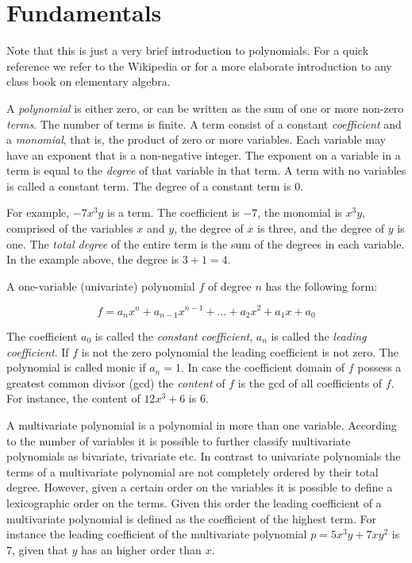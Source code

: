 

\section{Fundamentals}

Note that this is just a very brief introduction to polynomials. 
For a quick reference we refer to the Wikipedia or for a more elaborate 
introduction to any class book on elementary algebra. 

A {\em polynomial} is either zero, or can be written as the sum of one or more 
non-zero {\em terms}. The number of terms is finite. A term consist of a 
constant {\em coefficient} and a {\em monomial}, 
that is, the product of zero or more variables. 
Each variable may have an exponent that is a non-negative integer. 
The exponent on a variable in a term is equal to the {\em degree} of that 
variable in that term. A term with no variables is called a constant term.
The degree of a constant term is 0. 

For example, $-7x^3y$ is a term. The coefficient is $-7$, 
the monomial is $x^3y$, comprised of the variables $x$ and $y$, 
the degree of $x$ is three, and the degree of $y$ is one. 
The {\em total degree} of the entire term is the sum of the 
degrees in each variable. 
In the example above, the degree is $3 + 1 = 4$.

A one-variable (univariate) polynomial $f$ of degree $n$ has the following form:

\[f = a_nx^n + a_{n-1}x^{n-1} + ... + a_2x^2 + a_1x + a_0\]

The coefficient $a_0$ is called the {\em constant coefficient}, 
$a_n$ is called the {\em leading coefficient}.  
If $f$ is not the zero polynomial the leading coefficient is not zero. 
The polynomial is called monic if $a_n = 1$. 
In case the coefficient domain of $f$ possess a greatest common divisor 
(gcd) the {\em content} of $f$ is the gcd of all coefficients of $f$. 
For instance, the content of $12 x^3 + 6$ is $6$. 

A multivariate polynomial is a polynomial in more than one variable. 
According to the number of variables it is possible to 
further classify multivariate polynomials as bivariate, trivariate etc. 
In contrast to univariate polynomials the terms of a multivariate polynomial
are not completely ordered by their total degree. However, given a certain order 
on the variables it is possible to define a lexicographic order on the terms. 
Given this order the leading coefficient of a multivariate polynomial is defined 
as the coefficient of the highest term. For instance the leading coefficient of 
the multivariate polynomial $p = 5 x^3y + 7xy^2$ is $7$, given that $y$ has an 
higher order than $x$. 

